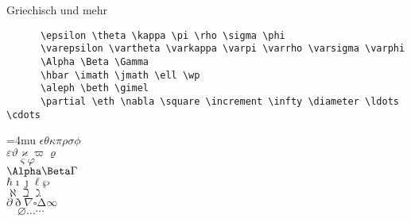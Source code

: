 \begin{frame}[fragile]{Griechisch und mehr}
  \begin{CodeExample}{0.70}
    \begin{lstlisting}
      \epsilon \theta \kappa \pi \rho \sigma \phi
      \varepsilon \vartheta \varkappa \varpi \varrho \varsigma \varphi
      \Alpha \Beta \Gamma
      \hbar \imath \jmath \ell \wp
      \aleph \beth \gimel
      \partial \eth \nabla \square \increment \infty \diameter \ldots \cdots
    \end{lstlisting}
  \CodeResult
    \Umathordordspacing\textstyle=4mu
    $\epsilon \theta \kappa \pi \rho \sigma \phi$ \\
    $\varepsilon \vartheta \varkappa \varpi \varrho$ \\
    $\quad \varsigma \varphi$ \\
    $\Alpha \Beta \Gamma$ \\
    $\hbar \imath \jmath \ell \wp$ \\
    $\aleph \beth \gimel$ \\
    $\partial \eth \nabla \square \increment \infty$ \\
    $\quad \diameter \ldots \cdots$
  \end{CodeExample}
\end{frame}

